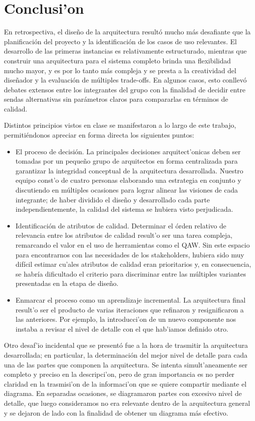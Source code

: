 \section{Conclusi'on}

En retrospectiva, el diseño de la arquitectura resultó mucho más desafiante que la planificación del proyecto y la identificación de los casos de uso relevantes. El desarrollo de las primeras instancias es relativamente estructurado, mientras que construir una arquitectura para el sistema completo brinda una flexibilidad mucho mayor, y es por lo tanto más compleja y se presta a la creatividad del diseñador y la evaluación de múltiples trade-offs. En algunos casos, esto conllevó debates extensos entre los integrantes del grupo con la finalidad de decidir entre sendas alternativas sin parámetros claros para compararlas en términos de calidad.

Distintos principios vistos en clase se manifestaron a lo largo de este trabajo, permitiéndonos apreciar en forma directa los siguientes puntos:

\begin{itemize}
\item El proceso de decisión. La principales decisiones arquitect'onicas deben ser tomadas por un pequeño grupo de arquitectos en forma centralizada para garantizar la integridad conceptual de la arquitectura desarrollada. Nuestro equipo const'o de cuatro personas elaborando una estrategia en conjunto y discutiendo en múltiples ocasiones para lograr alinear las visiones de cada integrante; de haber dividido el diseño y desarrollado cada parte independientemente, la calidad del sistema se hubiera visto perjudicada.
\item Identificación de atributos de calidad. Determinar el órden relativo de relevancia entre los atributos de calidad result'o ser una tarea compleja, remarcando el valor en el uso de herramientas como el QAW. Sin este espacio para encontrarnos con las necesidades de los stakeholders, hubiera sido muy difícil estimar cu'ales atributos de calidad eran prioritarios y, en consecuencia, se habría dificultado el criterio para discriminar entre las múltiples variantes presentadas en la etapa de diseño.
\item Enmarcar el proceso como un aprendizaje incremental. La arquitectura final result'o ser el producto de varias iteraciones que refinaron
  y resignificaron a las anteriores. Por ejemplo, la introducci'on de un nuevo componente nos instaba a revisar el nivel de detalle con el que
  hab'iamos definido otro.
\end{itemize}

Otro desaf'io incidental que se presentó fue a la hora de trasmitir la arquitectura desarrollada; en particular, la determinación del mejor nivel de detalle para cada una de las partes que componen la  arquitectura. Se intenta simult'aneamente ser completo y preciso en la descripci'on, pero de gran importancia es no perder claridad en la trasmisi'on de la informaci'on que se quiere compartir mediante el diagrama. En separadas ocasiones, se diagramaron partes con excesivo nivel de detalle, que luego consideramos no era relevante dentro de la arquitectura general y se dejaron de lado con la finalidad de obtener un diagrama más efectivo.


